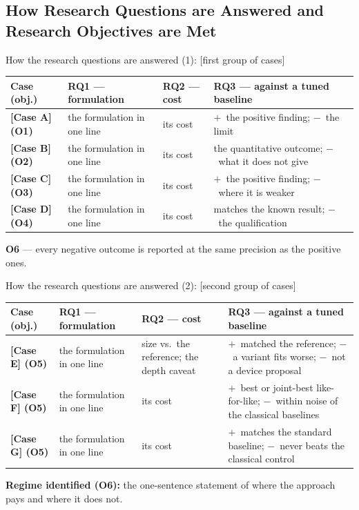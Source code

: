 \documentclass[aspectratio=43, 11pt, xcolor=dvipsnames, compress]{beamer}
\newcommand{\rqplus}{\alert{$+$}}
\newcommand{\rqminus}{\textcolor{nustgrey}{$-$}}
\begin{document}
\subsection[RQs Answered / Objectives Met]{How Research Questions are Answered and Research Objectives are Met}
\begin{frame}{How the research questions are answered (1): [first group of cases]}
  \scriptsize
  \renewcommand{\arraystretch}{1.25}
  \begin{tabularx}{\textwidth}{@{}>{\raggedright\arraybackslash\bfseries}p{} Y Y Y@{}}
    \toprule
    Case (obj.) & RQ1 --- formulation & RQ2 --- cost & RQ3 --- against a tuned baseline \\
    \midrule
    {}[Case A] (O1) & the formulation in one line & its cost & \rqplus\ the positive finding; \rqminus\ the limit \\
    {}[Case B] (O2) & the formulation in one line & its cost & the quantitative outcome; \rqminus\ what it does not give \\
    {}[Case C] (O3) & the formulation in one line & its cost & \rqplus\ the positive finding; \rqminus\ where it is weaker \\
    {}[Case D] (O4) & the formulation in one line & its cost & matches the known result; \rqminus\ the qualification \\
    \bottomrule
  \end{tabularx}
  \vskip0.2cm
  \textbf{O6} --- every negative outcome is reported at the same precision as the positive ones.
\end{frame}

\begin{frame}{How the research questions are answered (2): [second group of cases]}
  \scriptsize
  \renewcommand{\arraystretch}{1.25}
  \begin{tabularx}{\textwidth}{@{}>{\raggedright\arraybackslash\bfseries}p{} Y Y Y@{}}
    \toprule
    Case (obj.) & RQ1 --- formulation & RQ2 --- cost & RQ3 --- against a tuned baseline \\
    \midrule
    {}[Case E] (O5) & the formulation in one line & size vs.\ the reference; the depth caveat & \rqplus\ matched the reference; \rqminus\ a variant fits worse; \rqminus\ not a device proposal \\
    {}[Case F] (O5) & the formulation in one line & its cost & \rqplus\ best or joint-best like-for-like; \rqminus\ within noise of the classical baselines \\
    {}[Case G] (O5) & the formulation in one line & its cost & \rqplus\ matches the standard baseline; \rqminus\ never beats the classical control \\
    \bottomrule
  \end{tabularx}
  \vskip0.2cm
  \textbf{Regime identified (O6):} the one-sentence statement of where the approach pays and where it does not.
\end{frame}
\end{document}
